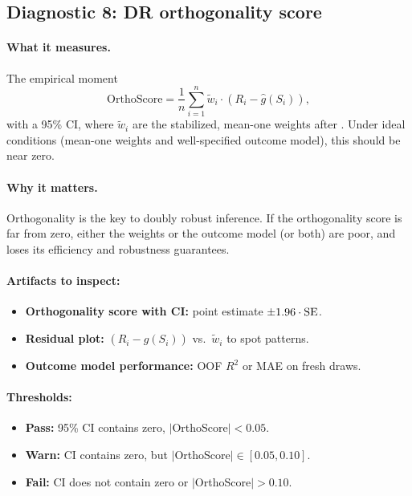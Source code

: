 \begin{enumerate}[resume]
\subsection{Diagnostic 8: DR orthogonality score}

\paragraph{What it measures.} The empirical moment
\begin{equation}
\text{OrthoScore} = \frac{1}{n} \sum_{i=1}^n \tilde{w}_i \cdot (R_i - \hat{g}(S_i)),
\end{equation}
with a 95\% CI, where $\tilde{w}_i$ are the stabilized, mean-one weights after \simcal. Under ideal conditions (mean-one weights and well-specified outcome model), this should be near zero.

\paragraph{Why it matters.} Orthogonality is the key to doubly robust inference. If the orthogonality score is far from zero, either the weights or the outcome model (or both) are poor, and \dr{} loses its efficiency and robustness guarantees.

\paragraph{Artifacts to inspect:}
\begin{itemize}
\item \textbf{Orthogonality score with CI:} point estimate $\pm 1.96 \cdot \operatorname{SE}$.
\item \textbf{Residual plot:} $(R_i - \hat{g}(S_i))$ vs.\ $\tilde{w}_i$ to spot patterns.
\item \textbf{Outcome model performance:} OOF $R^2$ or MAE on fresh draws.
\end{itemize}

\paragraph{Thresholds:}
\begin{itemize}
\item \textbf{Pass:} 95\% CI contains zero, $|$OrthoScore$| < 0.05$.
\item \textbf{Warn:} CI contains zero, but $|$OrthoScore$| \in [0.05, 0.10]$.
\item \textbf{Fail:} CI does not contain zero or $|$OrthoScore$| > 0.10$.
\end{itemize}


\end{enumerate}

